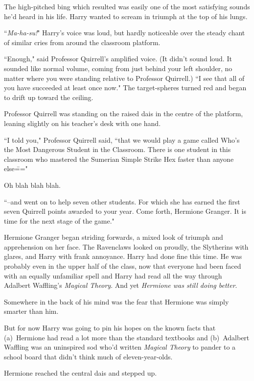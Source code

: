 The high-pitched bing which resulted was easily one of the most satisfying sounds he'd heard in his life. Harry wanted to scream in triumph at the top of his lungs. \emph{}

``\emph{Ma-ha-su!}" Harry's voice was loud, but hardly noticeable over the steady chant of similar cries from around the classroom platform.

``Enough," said Professor Quirrell's amplified voice. (It didn't sound loud. It sounded like normal volume, coming from just behind your left shoulder, no matter where you were standing relative to Professor Quirrell.) ``I see that all of you have succeeded at least once now." The target-spheres turned red and began to drift up toward the ceiling.

Professor Quirrell was standing on the raised dais in the centre of the platform, leaning slightly on his teacher's desk with one hand.

``I told you," Professor Quirrell said, ``that we would play a game called Who's the Most Dangerous Student in the Classroom. There is one student in this classroom who mastered the Sumerian Simple Strike Hex faster than anyone else\==="

Oh blah blah blah.

``\---and went on to help seven other students. For which she has earned the first seven Quirrell points awarded to your year. Come forth, Hermione Granger. It is time for the next stage of the game."

Hermione Granger began striding forwards, a mixed look of triumph and apprehension on her face. The Ravenclaws looked on proudly, the Slytherins with glares, and Harry with frank annoyance. Harry had done fine this time. He was probably even in the upper half of the class, now that everyone had been faced with an equally unfamiliar spell and Harry had read all the way through Adalbert Waffling's \emph{Magical Theory}. And yet \emph{Hermione was still doing better}.

Somewhere in the back of his mind was the fear that Hermione was simply smarter than him.

But for now Harry was going to pin his hopes on the known facts that (a)~Hermione had read a lot more than the standard textbooks and (b)~Adalbert Waffling was an uninspired sod who'd written \emph{Magical Theory} to pander to a school board that didn't think much of eleven-year-olds.

Hermione reached the central dais and stepped up.

